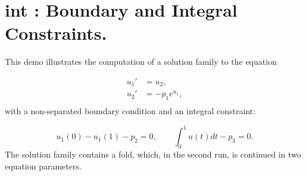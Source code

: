 \documentclass[12pt]{report}
\begin{document}
\newpage
\section{ int : Boundary and Integral Constraints.} \label{sec:Demos_int}
This demo illustrates the computation of a solution family to
the equation

\begin{equation} \begin{array}{cl}
 u_1 ' &= u_2 , \\
  u_2 ' &= -p_1  e^{u_1} , \\\end{array} \end{equation}
with a non-separated boundary condition and an integral constraint:

$$ u_1(0)-u_1(1)-p_2=0 ,\qquad \int_0^{1}u(t)dt-p_3=0 . $$
The solution family contains a fold, which, in the second run, is  
continued in two equation parameters.
\end{document}
